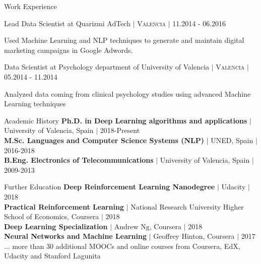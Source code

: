 \documentclass{resume} %
\begin{document}
\begin{rSection}{Work Experience}
\vspace{-6pt}

\begin{rSubsection}{Lead Data Scientist at Quarizmi AdTech  $|$  \textnormal{\textsc{Valencia}} $|$ \textnormal{11.2014 - 06.2016}}{}{}

    \vspace{-3pt}

    \item Used Machine Learning and NLP techniques to generate and maintain digital marketing campaigns in Google Adwords.
\end{rSubsection}

\vspace{-6pt}

\begin{rSubsection}{Data Scientist at Psychology department of University of Valencia  $|$  \textnormal{\textsc{Valencia}} $|$ \textnormal{05.2014 - 11.2014}}{}{}

    \vspace{-3pt}

    \item Analyzed data coming from clinical psychology studies using advanced Machine Learning techniques

\end{rSubsection}


\end{rSection}


\begin{rSection}{Academic History}
{\textbf{Ph.D. in Deep Learning algorithms and applications}  $|$  University of Valencia, Spain} $|$ {2018-Present}
\\
{\textbf{M.Sc. Languages and Computer Science Systems (NLP)}  $|$  UNED, Spain} $|$  {2016-2018}
\\
{\textbf{B.Eng. Electronics of Telecommunications}  $|$ University of Valencia, Spain} $|$  {2009-2013}
\end{rSection}

\begin{rSection}{Further Education}
{\textbf{Deep Reinforcement Learning Nanodegree}  $|$  Udacity} $|$  {2018}\\
{\textbf{Practical Reinforcement Learning}  $|$  National Research University Higher School of Economics, Coursera} $|$  {2018}\\
{\textbf{Deep Learning Specialization}  $|$  Andrew Ng, Coursera} $|$  {2018}\\
{\textbf{Neural Networks and Machine Learning}  $|$  Geoffrey Hinton, Coursera $|$  {2017}}\\
{... more than 30 additional MOOCs and online courses from Coursera, EdX, Udacity and Stanford Lagunita}
\end{rSection}
\end{document}
